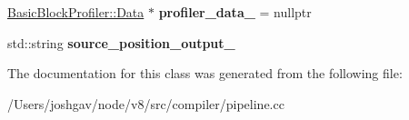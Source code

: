 \begin{DoxyCompactItemize}
\item 
\hyperlink{classv8_1_1internal_1_1_basic_block_profiler_1_1_data}{Basic\+Block\+Profiler\+::\+Data} $\ast$ {\bfseries profiler\+\_\+data\+\_\+} = nullptr\hypertarget{classv8_1_1internal_1_1compiler_1_1_pipeline_data_ada394c89e0193586625c8cbd513659be}{}\label{classv8_1_1internal_1_1compiler_1_1_pipeline_data_ada394c89e0193586625c8cbd513659be}

\item 
std\+::string {\bfseries source\+\_\+position\+\_\+output\+\_\+}\hypertarget{classv8_1_1internal_1_1compiler_1_1_pipeline_data_a780d26ff8046d1405c551ad6c479b268}{}\label{classv8_1_1internal_1_1compiler_1_1_pipeline_data_a780d26ff8046d1405c551ad6c479b268}

\end{DoxyCompactItemize}


The documentation for this class was generated from the following file\+:\begin{DoxyCompactItemize}
\item 
/\+Users/joshgav/node/v8/src/compiler/pipeline.\+cc\end{DoxyCompactItemize}
